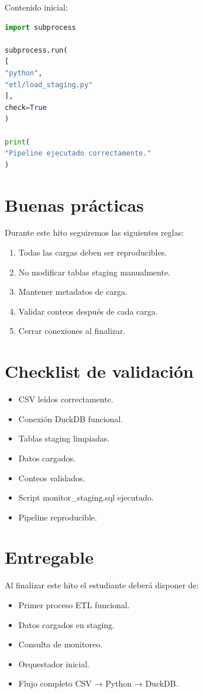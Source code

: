 Contenido inicial:

\begin{lstlisting}[language=Python]
import subprocess

subprocess.run(
[
"python",
"etl/load_staging.py"
],
check=True
)

print(
"Pipeline ejecutado correctamente."
)
\end{lstlisting}

\section{Buenas prácticas}

Durante este hito seguiremos las siguientes reglas:

\begin{enumerate}
\item Todas las cargas deben ser reproducibles.
\item No modificar tablas staging manualmente.
\item Mantener metadatos de carga.
\item Validar conteos después de cada carga.
\item Cerrar conexiones al finalizar.
\end{enumerate}

\section{Checklist de validación}

\begin{itemize}
\item[$\Box$] CSV leídos correctamente.
\item[$\Box$] Conexión DuckDB funcional.
\item[$\Box$] Tablas staging limpiadas.
\item[$\Box$] Datos cargados.
\item[$\Box$] Conteos validados.
\item[$\Box$] Script monitor_staging.sql ejecutado.
\item[$\Box$] Pipeline reproducible.
\end{itemize}

\section{Entregable}

Al finalizar este hito el estudiante deberá disponer de:

\begin{itemize}
\item Primer proceso ETL funcional.
\item Datos cargados en staging.
\item Consulta de monitoreo.
\item Orquestador inicial.
\item Flujo completo CSV → Python → DuckDB.
\end{itemize}

